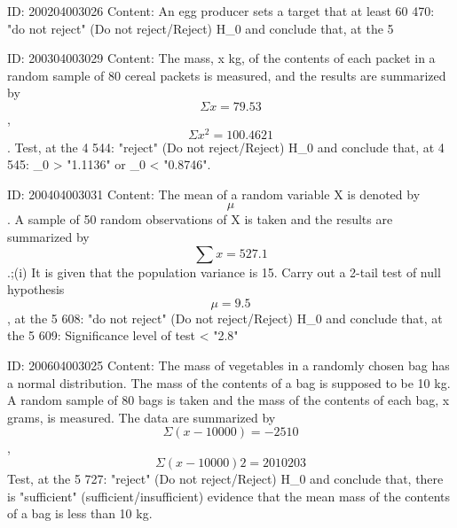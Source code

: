 \documentclass{article}
\begin{document}
ID: 200204003026
Content:
An egg producer sets a target that at least 60%
470: "do not reject" (Do not reject/Reject) H_0 and conclude that, at the 5%

ID: 200304003029
Content:
The mass, x kg, of the contents of each packet in a random sample of 80 cereal packets is measured, and the results are summarized by $$\Sigma x=79.53$$, $$\Sigma x^2 = 100.4621$$. Test, at the 4%
544: "reject" (Do not reject/Reject) H_0 and conclude that, at 4%
545: \mu_0 > "1.1136" or \mu_0 < "0.8746".

ID: 200404003031
Content:
The mean of a random variable X is denoted by $$\mu$$. A sample of 50 random observations of X is taken and the results are summarized by $$\sum x = 527.1$$.;(i) It is given that the population variance is 15. Carry out a 2-tail test of null hypothesis $$\mu = 9.5$$, at the 5%
608: "do not reject" (Do not reject/Reject) H_0 and conclude that, at the 5%
609: Significance level of test < "2.8"%

ID: 200604003025
Content:
The mass of vegetables in a randomly chosen bag has a normal distribution. The mass of the contents of a bag is supposed to be 10 kg. A random sample of 80 bags is taken and the mass of the contents of each bag, x grams, is measured. The data are summarized by  $$\Sigma (x-10000) = -2510$$,  $$\Sigma (x-10000)2 = 2010203$$ Test, at the 5%
727: "reject" (Do not reject/Reject) H_0 and conclude that, there is "sufficient" (sufficient/insufficient) evidence that the mean mass of the contents of a bag is less than 10 kg.
\end{document}
